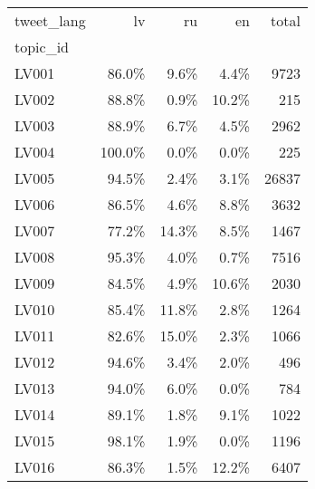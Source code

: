\begin{tabular}{lrrrr}
\toprule
tweet\_lang &     lv &    ru &    en &  total \\
topic\_id &        &       &       &        \\
\midrule
LV001    &  86.0\% &  9.6\% &  4.4\% &   9723 \\
LV002    &  88.8\% &  0.9\% & 10.2\% &    215 \\
LV003    &  88.9\% &  6.7\% &  4.5\% &   2962 \\
LV004    & 100.0\% &  0.0\% &  0.0\% &    225 \\
LV005    &  94.5\% &  2.4\% &  3.1\% &  26837 \\
LV006    &  86.5\% &  4.6\% &  8.8\% &   3632 \\
LV007    &  77.2\% & 14.3\% &  8.5\% &   1467 \\
LV008    &  95.3\% &  4.0\% &  0.7\% &   7516 \\
LV009    &  84.5\% &  4.9\% & 10.6\% &   2030 \\
LV010    &  85.4\% & 11.8\% &  2.8\% &   1264 \\
LV011    &  82.6\% & 15.0\% &  2.3\% &   1066 \\
LV012    &  94.6\% &  3.4\% &  2.0\% &    496 \\
LV013    &  94.0\% &  6.0\% &  0.0\% &    784 \\
LV014    &  89.1\% &  1.8\% &  9.1\% &   1022 \\
LV015    &  98.1\% &  1.9\% &  0.0\% &   1196 \\
LV016    &  86.3\% &  1.5\% & 12.2\% &   6407 \\
\bottomrule
\end{tabular}
